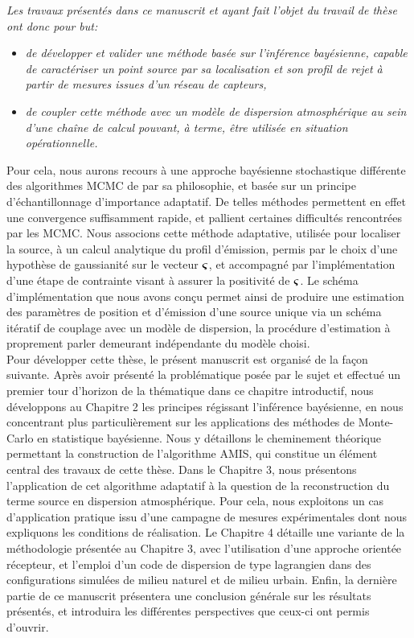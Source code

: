 \textit{Les travaux présentés dans ce manuscrit et ayant fait l'objet du travail de thèse ont donc pour but: }

\begin{itemize}
	\item \textit{de développer et valider une méthode basée sur l'inférence bayésienne, capable de caractériser un point source par sa localisation et son profil de rejet à partir de mesures issues d'un réseau de capteurs, }
	\item \textit{de coupler cette méthode avec un modèle de dispersion atmosphérique au sein d'une chaîne de calcul pouvant, à terme, être utilisée en situation opérationnelle.} \\
\end{itemize}


Pour cela, nous {aurons} recours à une approche bayésienne stochastique différente des algorithmes MCMC de par sa philosophie, et basée sur un principe d'échantillonnage d'importance adaptatif. De telles méthodes permettent en effet une convergence suffisamment rapide, et pallient certaines difficultés rencontrées par les MCMC. Nous associons cette méthode adaptative, utilisée pour localiser la source, à un calcul analytique du profil d'émission, permis par le choix d'une hypothèse de gaussianité sur le vecteur ${\bm{\varsigma}}$, et accompagné par l'implémentation d'une étape de contrainte visant à assurer la positivité de ${\bm{\varsigma}}$. Le schéma d'implémentation que nous avons conçu permet ainsi de produire une estimation des paramètres de position et d'émission d'une source unique via un schéma itératif de couplage avec un modèle de dispersion, la procédure d'estimation à proprement parler demeurant indépendante du modèle choisi. \\

Pour développer cette thèse, le présent manuscrit est organisé de la façon suivante. Après avoir présenté la problématique posée par le sujet et effectué un premier tour d'horizon de la thématique dans ce chapitre introductif, nous développons au Chapitre 2 les principes régissant l'inférence bayésienne, en nous concentrant plus particulièrement sur les applications des méthodes de Monte-Carlo en statistique bayésienne. Nous y détaillons le cheminement théorique permettant la construction de l'algorithme AMIS, qui constitue un élément central des travaux de cette thèse. 
Dans le Chapitre 3, nous présentons l'application de cet algorithme adaptatif à la question de la reconstruction du terme source en dispersion atmosphérique. Pour cela, nous exploitons un cas d'application pratique issu d'une campagne de mesures expérimentales dont nous expliquons les conditions de réalisation. Le Chapitre 4 détaille une variante de la méthodologie présentée au Chapitre 3, avec l'utilisation d'une approche orientée récepteur, et l'emploi d'un code de dispersion de type lagrangien dans des configurations simulées de {milieu naturel} et de milieu urbain.
{Enfin, la dernière partie de ce manuscrit présentera une conclusion générale sur les résultats présentés, et introduira les différentes perspectives que ceux-ci ont permis d'ouvrir.}
